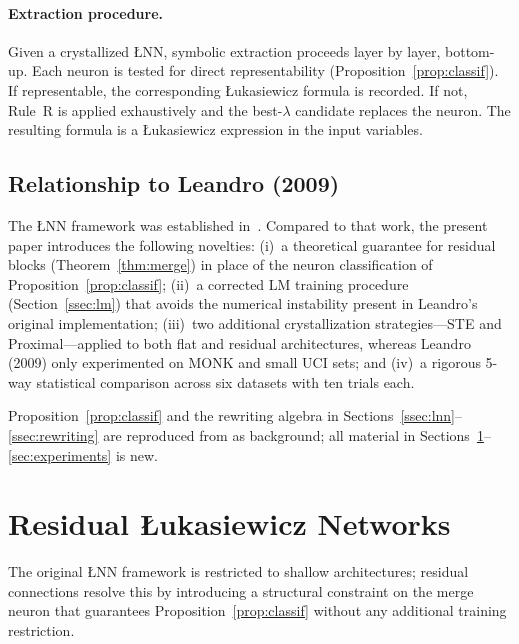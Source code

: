 \documentclass[lettersize,journal]{IEEEtran}
\newcommand{\LNN}{\L{}NN}
\begin{document}
\paragraph{Extraction procedure.}
Given a crystallized \LNN{}, symbolic extraction proceeds layer by layer,
bottom-up.
Each neuron is tested for direct representability (Proposition~\ref{prop:classif}).
If representable, the corresponding \L{}ukasiewicz formula is recorded.
If not, Rule~R is applied exhaustively and the best-$\lambda$ candidate
replaces the neuron.
The resulting formula is a \L{}ukasiewicz expression in the input variables.

\subsection{Relationship to Leandro (2009)}
\label{ssec:prior}

The \LNN{} framework was established in~\cite{leandro2009}.
Compared to that work, the present paper introduces the following
novelties: (i)~a theoretical guarantee for residual blocks
(Theorem~\ref{thm:merge}) in place of the neuron classification of
Proposition~\ref{prop:classif}; (ii)~a corrected LM training procedure
(Section~\ref{ssec:lm}) that avoids the numerical instability present in
Leandro's original implementation; (iii)~two additional crystallization
strategies---STE and Proximal---applied to both flat and residual
architectures, whereas Leandro (2009) only experimented on MONK and small
UCI sets; and (iv)~a rigorous 5-way statistical comparison across six
datasets with ten trials each.

Proposition~\ref{prop:classif} and the rewriting algebra in
Sections~\ref{ssec:lnn}--\ref{ssec:rewriting} are reproduced from
\cite{leandro2009} as background; all material in
Sections~\ref{sec:residual}--\ref{sec:experiments} is new.

\section{Residual \L{}ukasiewicz Networks}
\label{sec:residual}

The original \LNN{} framework is restricted to shallow architectures; residual
connections resolve this by introducing a structural constraint on the merge
neuron that guarantees Proposition~\ref{prop:classif} without any additional
training restriction.
\end{document}
